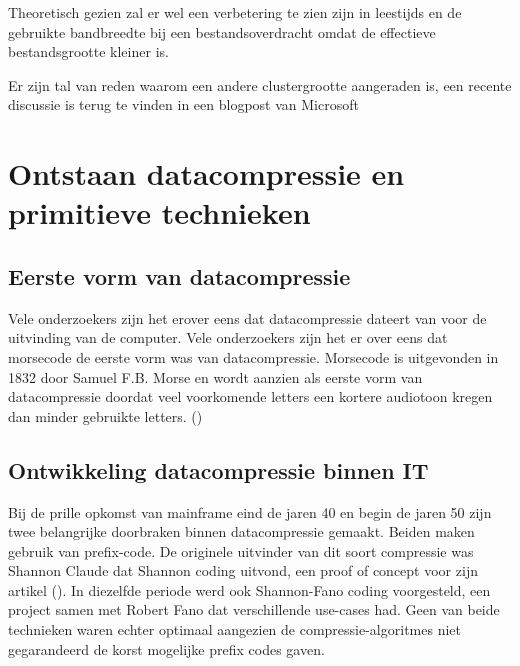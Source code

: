 Theoretisch gezien zal er wel een verbetering te zien zijn in \glspl{leestijd} en de gebruikte \gls{bandbreedte} bij een bestandsoverdracht omdat de effectieve bestandsgrootte kleiner is. 

Er zijn tal van reden waarom een andere \gls{clustergrootte} aangeraden is, een recente discussie is terug te vinden in een blogpost van Microsoft

\section{Ontstaan datacompressie en primitieve technieken}
\label{sec:ontstaan-datacompressie-primitieve-technieken}
\subsection{Eerste vorm van datacompressie}
\label{sec:ontstaan-datacompressie-primitieve-technieken-eerste-vorm}
Vele onderzoekers zijn het erover eens dat \gls{datacompressie} dateert van voor de uitvinding van de computer. Vele onderzoekers zijn het er over eens dat morsecode de eerste vorm was van \gls{datacompressie}. Morsecode is uitgevonden in 1832 door Samuel F.B. Morse en wordt aanzien als eerste vorm van datacompressie doordat veel voorkomende letters een kortere audiotoon kregen dan minder gebruikte letters. (\cite{morsecode})

\subsection{Ontwikkeling datacompressie binnen IT}
\label{sec:ontstaan-datacompressie-primitieve-technieken-binnen-it}

Bij de prille opkomst van mainframe eind de jaren 40 en begin de jaren 50 zijn twee belangrijke doorbraken binnen \gls{datacompressie} gemaakt. Beiden maken gebruik van \gls{prefix-code}. De originele uitvinder van dit soort compressie was Shannon Claude dat Shannon coding uitvond, een proof of concept voor zijn artikel  (\cite{shannon1948}). In diezelfde periode werd ook Shannon-Fano coding voorgesteld, een project samen met Robert Fano dat verschillende \glspl{use-case} had. Geen van beide technieken waren echter optimaal aangezien de \glspl{compressie-algoritme} niet gegarandeerd de korst mogelijke prefix codes gaven. 

